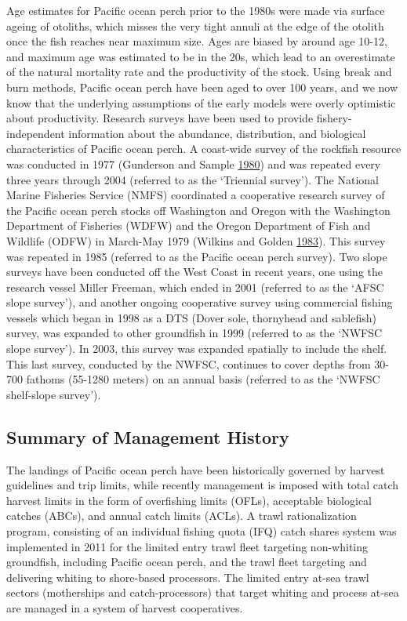 \documentclass[12pt,]{article}
\begin{document}
Age estimates for Pacific ocean perch prior to the 1980s were made via
surface ageing of otoliths, which misses the very tight annuli at the
edge of the otolith once the fish reaches near maximum size. Ages are
biased by around age 10-12, and maximum age was estimated to be in the
20s, which lead to an overestimate of the natural mortality rate and the
productivity of the stock. Using break and burn methods, Pacific ocean
perch have been aged to over 100 years, and we now know that the
underlying assumptions of the early models were overly optimistic about
productivity. Research surveys have been used to provide
fishery-independent information about the abundance, distribution, and
biological characteristics of Pacific ocean perch. A coast-wide survey
of the rockfish resource was conducted in 1977 (Gunderson and Sample
\protect\hyperlink{ref-gunderson_distribution_1980}{1980}) and was
repeated every three years through 2004 (referred to as the `Triennial
survey'). The National Marine Fisheries Service (NMFS) coordinated a
cooperative research survey of the Pacific ocean perch stocks off
Washington and Oregon with the Washington Department of Fisheries (WDFW)
and the Oregon Department of Fish and Wildlife (ODFW) in March-May 1979
(Wilkins and Golden
\protect\hyperlink{ref-wilkins_condition_1983}{1983}). This survey was
repeated in 1985 (referred to as the Pacific ocean perch survey). Two
slope surveys have been conducted off the West Coast in recent years,
one using the research vessel Miller Freeman, which ended in 2001
(referred to as the `AFSC slope survey'), and another ongoing
cooperative survey using commercial fishing vessels which began in 1998
as a DTS (Dover sole, thornyhead and sablefish) survey, was expanded to
other groundfish in 1999 (referred to as the `NWFSC slope survey'). In
2003, this survey was expanded spatially to include the shelf. This last
survey, conducted by the NWFSC, continues to cover depths from 30-700
fathoms (55-1280 meters) on an annual basis (referred to as the `NWFSC
shelf-slope survey').

\subsection{Summary of Management
History}\label{summary-of-management-history}

The landings of Pacific ocean perch have been historically governed by
harvest guidelines and trip limits, while recently management is imposed
with total catch harvest limits in the form of overfishing limits
(OFLs), acceptable biological catches (ABCs), and annual catch limits
(ACLs). A trawl rationalization program, consisting of an individual
fishing quota (IFQ) catch shares system was implemented in 2011 for the
limited entry trawl fleet targeting non-whiting groundfish, including
Pacific ocean perch, and the trawl fleet targeting and delivering
whiting to shore-based processors. The limited entry at-sea trawl
sectors (motherships and catch-processors) that target whiting and
process at-sea are managed in a system of harvest cooperatives.
\end{document}
